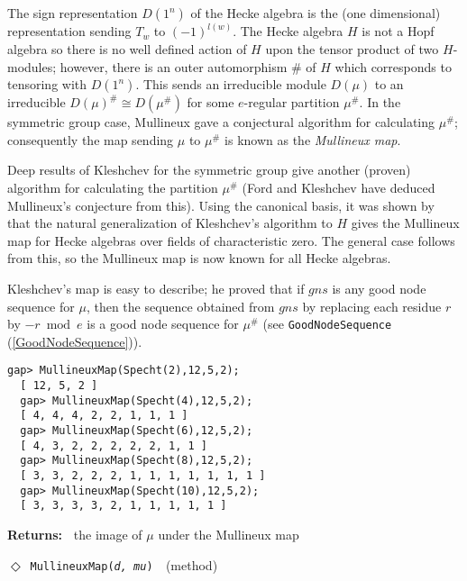 \documentclass[a4paper,11pt]{report}
\begin{document}
{{{ The sign representation $D(1^n)$ of the Hecke algebra is the (one dimensional) representation sending $T_w$ to $(-1)^{l(w)}$. The Hecke algebra $H$ is not a Hopf algebra so there is no well defined action of $H$ upon the tensor product of two $H$-modules; however, there is an outer automorphism $\#$ of $H$ which corresponds to tensoring with $D(1^n)$. This sends an irreducible module $D(\mu)$ to an irreducible $D(\mu)^\#\cong D(\mu^\#)$ for some $e$-regular partition $\mu^\#$. In the symmetric group case, Mullineux gave a conjectural algorithm for
calculating $\mu^\#$; consequently the map sending $\mu$ to $\mu^\#$ is known as the \emph{Mullineux map}.

 Deep results of Kleshchev \cite{K} for the symmetric group give another (proven) algorithm for calculating the
partition $\mu^\#$ (Ford and Kleshchev have deduced Mullineux's conjecture from this). Using the
canonical basis, it was shown by \cite{LLT} that the natural generalization of Kleshchev's algorithm to $H$ gives the Mullineux map for Hecke algebras over fields of characteristic zero.
The general case follows from this, so the Mullineux map is now known for all
Hecke algebras. 

 Kleshchev's map is easy to describe; he proved that if $gns$ is any good node sequence for $\mu$, then the sequence obtained from $gns$ by replacing each residue $r$ by $-r\bmod e$ is a good node sequence for $\mu^\#$ (see \texttt{GoodNodeSequence} (\ref{GoodNodeSequence})). 
\begin{Verbatim}[fontsize=\small,frame=single,label=Example]
  gap> MullineuxMap(Specht(2),12,5,2);
  [ 12, 5, 2 ]
  gap> MullineuxMap(Specht(4),12,5,2);
  [ 4, 4, 4, 2, 2, 1, 1, 1 ]
  gap> MullineuxMap(Specht(6),12,5,2);
  [ 4, 3, 2, 2, 2, 2, 2, 1, 1 ]
  gap> MullineuxMap(Specht(8),12,5,2);
  [ 3, 3, 2, 2, 2, 1, 1, 1, 1, 1, 1, 1 ]
  gap> MullineuxMap(Specht(10),12,5,2);
  [ 3, 3, 3, 3, 2, 1, 1, 1, 1, 1 ]
\end{Verbatim}
 \textbf{\indent Returns:\ }
the image of $\mu$ under the Mullineux map

\noindent\textcolor{FuncColor}{$\Diamond$\ \texttt{MullineuxMap({\slshape d, mu})
\label{MullineuxMap:for a decomposition matrix}
}\hfill{\scriptsize (method)}}\\


}}}
\end{document}
